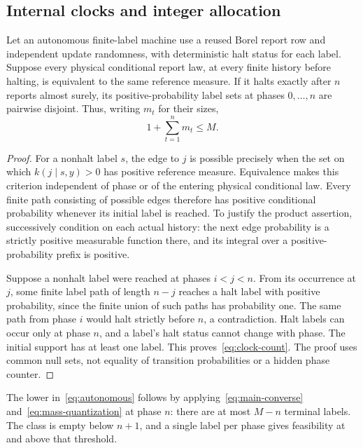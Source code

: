 \subsection{Internal clocks and integer allocation}
\begin{lemma}\label{lem:clock}
Let an autonomous finite-label machine use a reused Borel report row and independent update randomness, with deterministic halt status for each label. Suppose every physical conditional report law, at every finite history before halting, is equivalent to the same reference measure. If it halts exactly after $n$ reports almost surely, its positive-probability label sets at phases $0,\ldots,n$ are pairwise disjoint. Thus, writing $m_t$ for their sizes,
\begin{equation}\label{eq:clock-count}
 1+\sum_{t=1}^n m_t\le M.
\end{equation}
\end{lemma}
\begin{proof}
For a nonhalt label $s$, the edge to $j$ is possible precisely when the set on which $k(j\mid s,y)>0$ has positive reference measure. Equivalence makes this criterion independent of phase or of the entering physical conditional law. Every finite path consisting of possible edges therefore has positive conditional probability whenever its initial label is reached. To justify the product assertion, successively condition on each actual history: the next edge probability is a strictly positive measurable function there, and its integral over a positive-probability prefix is positive.

Suppose a nonhalt label were reached at phases $i<j<n$. From its occurrence at $j$, some finite label path of length $n-j$ reaches a halt label with positive probability, since the finite union of such paths has probability one. The same path from phase $i$ would halt strictly before $n$, a contradiction. Halt labels can occur only at phase $n$, and a label's halt status cannot change with phase. The initial support has at least one label. This proves~\eqref{eq:clock-count}. The proof uses common null sets, not equality of transition probabilities or a hidden phase counter.
\end{proof}
The lower in~\eqref{eq:autonomous} follows by applying~\eqref{eq:main-converse} and~\eqref{eq:mass-quantization} at phase $n$: there are at most $M-n$ terminal labels. The class is empty below $n+1$, and a single label per phase gives feasibility at and above that threshold.

